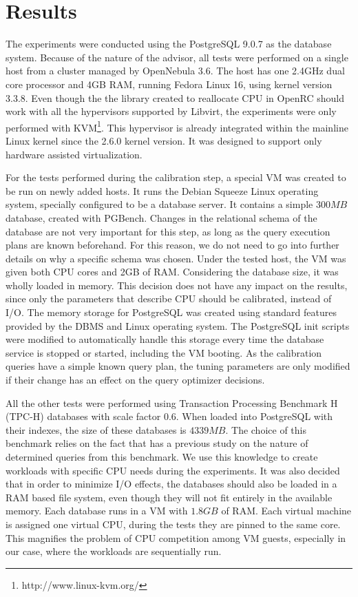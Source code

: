 \chapter{Results}

\label{chap:results}

The experiments were conducted using the PostgreSQL 9.0.7 as the database system. Because of the nature of the advisor, all tests were performed on a single host from a cluster managed by OpenNebula 3.6. The host has one 2.4GHz dual core processor and 4GB RAM, running Fedora Linux 16, using kernel version 3.3.8. Even though the the library created to reallocate CPU in OpenRC should work with all the hypervisors supported by Libvirt, the experiments were only performed with KVM\footnote{http://www.linux-kvm.org/}. This hypervisor is already integrated within the mainline Linux kernel since the 2.6.0 kernel version. It was designed to support only hardware assisted virtualization.

For the tests performed during the calibration step, a special VM was created to be run on newly added hosts. It runs the Debian Squeeze Linux operating system, specially configured to be a database server. It contains a simple $300MB$ database, created with PGBench. Changes in the relational schema of the database are not very important for this step, as long as the query execution plans are known beforehand. For this reason, we do not need to go into further details on why a specific schema was chosen. Under the tested host, the VM was given both CPU cores and 2GB of RAM. Considering the database size, it was wholly loaded in memory. This decision does not have any impact on the results, since only the parameters that describe CPU should be calibrated, instead of I/O. The memory storage for PostgreSQL was created using standard features provided by the DBMS and Linux operating system. The PostgreSQL init scripts were modified to automatically handle this storage every time the database service is stopped 
or started, including the VM booting. As the calibration queries have a simple known query plan, the tuning parameters are only modified if their change has an effect on the query optimizer decisions.

All the other tests were performed using Transaction Processing Benchmark H (TPC-H) databases with scale factor $0.6$. When loaded into PostgreSQL with their indexes, the size of these databases is $4339 MB$.  The choice of this benchmark relies on the fact that \cite{Soror:2008:AVM:1376616.1376711} has a previous study on the nature of determined queries from this benchmark. We use this knowledge to create workloads with specific CPU needs during the experiments.  It was also decided that in order to minimize I/O effects, the databases should also be loaded  in a RAM based file system, even though they will not fit entirely in the available memory. Each database runs in a VM with $1.8 GB$ of RAM.  Each virtual machine is assigned one virtual CPU, during the tests they are pinned to the same core. This magnifies the problem of CPU competition among VM guests, especially in our case, where the workloads are sequentially run. 

